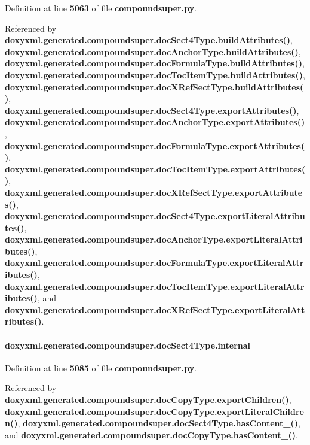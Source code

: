 Definition at line {\bf 5063} of file {\bf compoundsuper.\+py}.



Referenced by {\bf doxyxml.\+generated.\+compoundsuper.\+doc\+Sect4\+Type.\+build\+Attributes()}, {\bf doxyxml.\+generated.\+compoundsuper.\+doc\+Anchor\+Type.\+build\+Attributes()}, {\bf doxyxml.\+generated.\+compoundsuper.\+doc\+Formula\+Type.\+build\+Attributes()}, {\bf doxyxml.\+generated.\+compoundsuper.\+doc\+Toc\+Item\+Type.\+build\+Attributes()}, {\bf doxyxml.\+generated.\+compoundsuper.\+doc\+X\+Ref\+Sect\+Type.\+build\+Attributes()}, {\bf doxyxml.\+generated.\+compoundsuper.\+doc\+Sect4\+Type.\+export\+Attributes()}, {\bf doxyxml.\+generated.\+compoundsuper.\+doc\+Anchor\+Type.\+export\+Attributes()}, {\bf doxyxml.\+generated.\+compoundsuper.\+doc\+Formula\+Type.\+export\+Attributes()}, {\bf doxyxml.\+generated.\+compoundsuper.\+doc\+Toc\+Item\+Type.\+export\+Attributes()}, {\bf doxyxml.\+generated.\+compoundsuper.\+doc\+X\+Ref\+Sect\+Type.\+export\+Attributes()}, {\bf doxyxml.\+generated.\+compoundsuper.\+doc\+Sect4\+Type.\+export\+Literal\+Attributes()}, {\bf doxyxml.\+generated.\+compoundsuper.\+doc\+Anchor\+Type.\+export\+Literal\+Attributes()}, {\bf doxyxml.\+generated.\+compoundsuper.\+doc\+Formula\+Type.\+export\+Literal\+Attributes()}, {\bf doxyxml.\+generated.\+compoundsuper.\+doc\+Toc\+Item\+Type.\+export\+Literal\+Attributes()}, and {\bf doxyxml.\+generated.\+compoundsuper.\+doc\+X\+Ref\+Sect\+Type.\+export\+Literal\+Attributes()}.

\paragraph[{internal}]{\setlength{\rightskip}{0pt plus 5cm}doxyxml.\+generated.\+compoundsuper.\+doc\+Sect4\+Type.\+internal}\label{classdoxyxml_1_1generated_1_1compoundsuper_1_1docSect4Type_a32c5849055401d0df5f9202e4e356757}


Definition at line {\bf 5085} of file {\bf compoundsuper.\+py}.



Referenced by {\bf doxyxml.\+generated.\+compoundsuper.\+doc\+Copy\+Type.\+export\+Children()}, {\bf doxyxml.\+generated.\+compoundsuper.\+doc\+Copy\+Type.\+export\+Literal\+Children()}, {\bf doxyxml.\+generated.\+compoundsuper.\+doc\+Sect4\+Type.\+has\+Content\+\_\+()}, and {\bf doxyxml.\+generated.\+compoundsuper.\+doc\+Copy\+Type.\+has\+Content\+\_\+()}.

